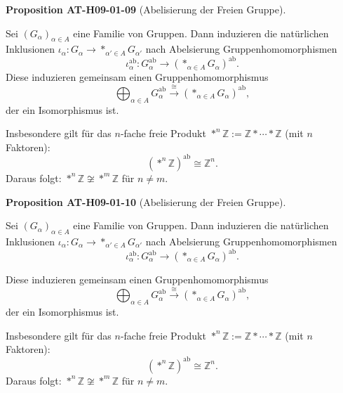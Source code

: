\documentclass[10pt, letterpaper]{article}
\newcommand{\CustomHeading}[3]{%
  \par\medskip\noindent%
  \textbf{#1 #2} \textnormal{(#3)}.\enskip%
}
\newenvironment{PROP}[2]{\CustomHeading{Proposition}{#1}{#2}}{}
\begin{document}
\begin{PROP}{AT-H09-01-09}{Abelisierung der Freien Gruppe}
Sei $(G_\alpha)_{\alpha \in A}$ eine Familie von Gruppen. Dann induzieren die natürlichen Inklusionen $\iota_\alpha: G_\alpha \rightarrow *_{\alpha' \in A} G_{\alpha'}$ nach Abelsierung Gruppenhomomorphismen
\[
\iota_\alpha^{\mathrm{ab}}: G_\alpha^{\mathrm{ab}} \rightarrow \left(*_{\alpha \in A} G_\alpha\right)^{\mathrm{ab}}.
\]
Diese induzieren gemeinsam einen Gruppenhomomorphismus
\[
\bigoplus_{\alpha \in A} G_\alpha^{\mathrm{ab}} \xrightarrow{\cong} \left(*_{\alpha \in A} G_\alpha\right)^{\mathrm{ab}},
\]
der ein Isomorphismus ist.
\begin{center}
\end{center}

Insbesondere gilt für das $n$-fache freie Produkt $*^n \mathbb{Z} := \mathbb{Z} * \cdots * \mathbb{Z}$ (mit $n$ Faktoren):
\[
\left(*^n \mathbb{Z}\right)^{\mathrm{ab}} \cong \mathbb{Z}^n.
\]
Daraus folgt: $*^n \mathbb{Z} \not\cong *^m \mathbb{Z}$ für $n \neq m$.
\end{PROP}

\begin{PROP}{AT-H09-01-10}{Abelisierung der Freien Gruppe}
Sei $(G_\alpha)_{\alpha \in A}$ eine Familie von Gruppen. Dann induzieren die natürlichen Inklusionen $\iota_\alpha: G_\alpha \rightarrow *_{\alpha' \in A} G_{\alpha'}$ nach Abelsierung Gruppenhomomorphismen
\[
\iota_\alpha^{\mathrm{ab}}: G_\alpha^{\mathrm{ab}} \rightarrow \left(*_{\alpha \in A} G_\alpha\right)^{\mathrm{ab}}.
\]
\begin{center}
\end{center}

Diese induzieren gemeinsam einen Gruppenhomomorphismus
\[
\bigoplus_{\alpha \in A} G_\alpha^{\mathrm{ab}} \xrightarrow{\cong} \left(*_{\alpha \in A} G_\alpha\right)^{\mathrm{ab}},
\]
der ein Isomorphismus ist.

Insbesondere gilt für das $n$-fache freie Produkt $*^n \mathbb{Z} := \mathbb{Z} * \cdots * \mathbb{Z}$ (mit $n$ Faktoren):
\[
\left(*^n \mathbb{Z}\right)^{\mathrm{ab}} \cong \mathbb{Z}^n.
\]
Daraus folgt: $*^n \mathbb{Z} \not\cong *^m \mathbb{Z}$ für $n \neq m$.
\end{PROP}
\end{document}

